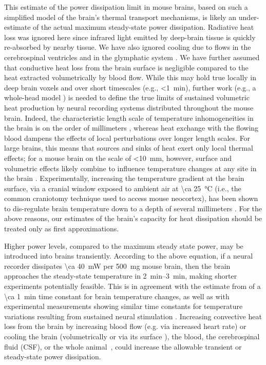 This estimate of the power dissipation limit in mouse brains, based on such a simplified model of the brain's thermal transport mechanisms, is likely an under-estimate of the actual maximum steady-state power dissipation.  Radiative heat loss was ignored here since infrared light emitted by deep-brain tissue is quickly re-absorbed by nearby tissue. We have also ignored cooling due to flows in the cerebrospinal ventricles \cite{smith2010brain} and in the glymphatic system \cite{iliff2012paravascular}. We have further assumed that conductive heat loss from the brain surface is negligible compared to the heat extracted volumetrically by blood flow. While this may hold true locally in deep brain voxels and over short timescales (e.g., \SI{<1}{\minute}), further work (e.g., a whole-head model \cite{Lazzi2005, sukstanskii2004analytical}) is needed to define the true limits of sustained volumetric heat production by neural recording systems distributed throughout the mouse brain. Indeed, the characteristic length scale of temperature inhomogeneities in the brain is on the order of millimeters \cite{sukstanskii2006theoretical}, whereas heat exchange with the flowing blood dampens the effects of local perturbations over longer length scales. For large brains, this means that sources and sinks of heat exert only local thermal effects; for a mouse brain on the scale of \SI{<10}{\milli\meter}, however, surface and volumetric effects likely combine to influence temperature changes at any site in the brain \cite{sukstanskii2007theoretical}. Experimentally, increasing the temperature gradient at the brain surface, via a cranial window exposed to ambient air at \SI{\ca 25}{\celsius} (i.e., the common craniotomy technique used to access mouse neocortex), has been shown to dis-regulate brain temperature down to a depth of several millimeters \cite{kalmbach2012brain}. For the above reasons, our estimates of the brain's capacity for heat dissipation should be treated only as first approximations.

Higher power levels, compared to the maximum steady state power, may be introduced into brains transiently.
According to the above equation, if a neural recorder dissipates \SI{\ca 40}{\milli\watt} per \SI{500}{\milli\gram} mouse brain, then the brain approaches the steady-state temperature in \SIrange{2}{3}{\minute}, making shorter experiments potentially feasible. This is in agreement with the estimate from \cite{sukstanskii2006theoretical} of a \SI{\ca 1}{\minute} time constant for brain temperature changes, as well as with experimental measurements showing similar time constants for temperature variations resulting from sustained neural stimulation \cite{mcelligott1967localized, trubel2005regional}. Increasing convective heat loss from the brain by increasing blood flow (e.g. via increased heart rate) or cooling the brain (volumetrically or via its surface \cite{sukstanskii2007theoretical}), the blood, the cerebrospinal fluid (CSF), or the whole animal~\cite{polderman2004}, could increase the allowable transient or steady-state power dissipation.

